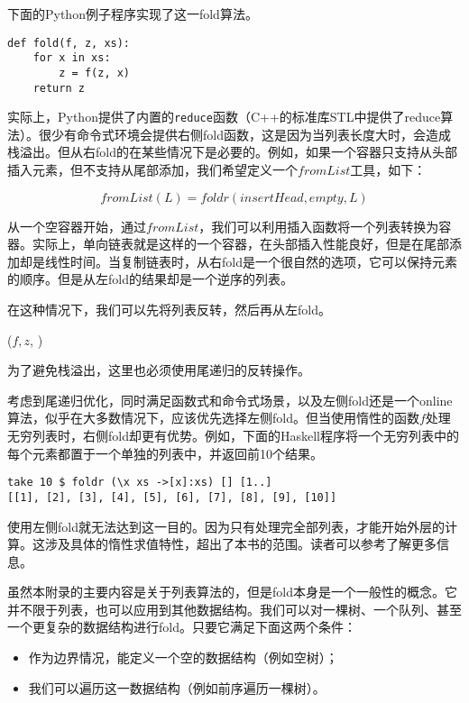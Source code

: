 \documentclass[UTF8]{article}
\begin{document}
下面的Python例子程序实现了这一fold算法。

\lstset{language=Python}
\begin{lstlisting}
def fold(f, z, xs):
    for x in xs:
        z = f(z, x)
    return z
\end{lstlisting}

实际上，Python提供了内置的\texttt{reduce}函数（C++的标准库STL中提供了reduce算法）。很少有命令式环境会提供右侧fold函数，这是因为当列表长度大时，会造成栈溢出。但从右fold的在某些情况下是必要的。例如，如果一个容器只支持从头部插入元素，但不支持从尾部添加，我们希望定义一个$fromList$工具，如下：

\[
fromList(L) = foldr(insertHead, empty, L)
\]

从一个空容器开始，通过$fromList$，我们可以利用插入函数将一个列表转换为容器。实际上，单向链表就是这样的一个容器，在头部插入性能良好，但是在尾部添加却是线性时间。当复制链表时，从右fold是一个很自然的选项，它可以保持元素的顺序。但是从左fold的结果却是一个逆序的列表。

在这种情况下，我们可以先将列表反转，然后再从左fold。

\begin{algorithmic}[1]
  \State \Return {}($f, z$, )
\EndFunction
\end{algorithmic}

为了避免栈溢出，这里也必须使用尾递归的反转操作。

考虑到尾递归优化，同时满足函数式和命令式场景，以及左侧fold还是一个online算法，似乎在大多数情况下，应该优先选择左侧fold。但当使用惰性的函数$f$处理无穷列表时，右侧fold却更有优势。例如，下面的Haskell程序将一个无穷列表中的每个元素都置于一个单独的列表中，并返回前10个结果。

\lstset{language=Haskell}
\begin{lstlisting}[style=Haskell]
take 10 $ foldr (\x xs ->[x]:xs) [] [1..]
[[1], [2], [3], [4], [5], [6], [7], [8], [9], [10]]
\end{lstlisting} %

使用左侧fold就无法达到这一目的。因为只有处理完全部列表，才能开始外层的计算。这涉及具体的惰性求值特性，超出了本书的范围。读者可以参考\cite{Haskell-wiki}了解更多信息。

虽然本附录的主要内容是关于列表算法的，但是fold本身是一个一般性的概念。它并不限于列表，也可以应用到其他数据结构。我们可以对一棵树、一个队列、甚至一个更复杂的数据结构进行fold。只要它满足下面这两个条件：

\begin{itemize}
\item 作为边界情况，能定义一个空的数据结构（例如空树）；
\item 我们可以遍历这一数据结构（例如前序遍历一棵树）。
\end{itemize}
\end{document}
